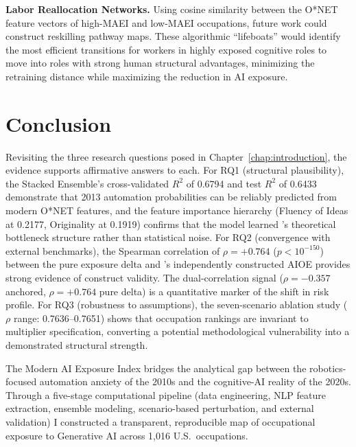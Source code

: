 \textbf{Labor Reallocation Networks.}
Using cosine similarity between the O*NET feature vectors of high-MAEI and
low-MAEI occupations, future work could construct reskilling pathway maps.  These
algorithmic ``lifeboats'' would identify the most efficient transitions for
workers in highly exposed cognitive roles to move into roles with strong human
structural advantages, minimizing the retraining distance while maximizing the
reduction in AI exposure.

\section{Conclusion}
\label{sec:conclusion}

Revisiting the three research questions posed in
Chapter~\ref{chap:introduction}, the evidence supports affirmative answers to
each.  For RQ1 (structural plausibility), the Stacked Ensemble's cross-validated
$R^2$ of 0.6794 and test $R^2$ of 0.6433 demonstrate that 2013 automation
probabilities can be reliably predicted from modern O*NET features, and the
feature importance hierarchy (Fluency of Ideas at 0.2177, Originality at 0.1919)
confirms that the model learned \citet{Frey_Osborne_2017}'s theoretical
bottleneck structure rather than statistical noise.  For RQ2 (convergence with
external benchmarks), the Spearman correlation of $\rho = +0.764$
($p < 10^{-150}$) between the pure exposure delta and
\citet{Felten_Raj_Seamans_2021}'s independently constructed AIOE provides strong
evidence of construct validity.  The dual-correlation signal ($\rho = -0.357$
anchored, $\rho = +0.764$ pure delta) is a quantitative marker of the shift in risk profile.  For RQ3 (robustness to assumptions), the seven-scenario
ablation study ($\rho$ range: 0.7636--0.7651) shows that
occupation rankings are invariant to multiplier specification, converting a
potential methodological vulnerability into a demonstrated structural strength.

The Modern AI Exposure Index bridges the analytical gap between the
robotics-focused automation anxiety of the 2010s and the cognitive-AI reality of
the 2020s.  Through a five-stage computational pipeline (data engineering, NLP
feature extraction, ensemble modeling, scenario-based perturbation, and external
validation) I constructed a transparent, reproducible map of occupational
exposure to Generative AI across 1,016 U.S.\ occupations.

